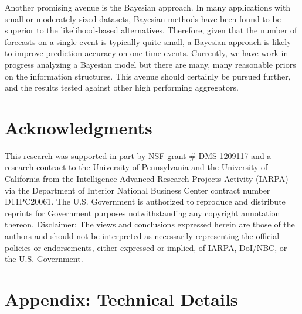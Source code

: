 \documentclass[11pt]{article}
\theoremstyle{definition}
\theoremstyle{definition}
\begin{document}
Another promising avenue is the Bayesian approach. In many applications with small or moderately sized datasets, Bayesian methods have been found to be superior to the likelihood-based alternatives. Therefore, given that the number of forecasts on a single event is typically quite small, a Bayesian approach is likely to improve prediction accuracy on one-time events. Currently, we have
work in progress analyzing a Bayesian model but there are many, many
reasonable priors on the information structures. 
 This avenue should
certainly be pursued further, and the results tested against other high
performing aggregators.


\section*{Acknowledgments} 
This research was supported in part by NSF grant \# DMS-1209117 and a research contract to the University
of Pennsylvania and the University of California from the Intelligence
Advanced Research Projects Activity (IARPA) via the Department of
Interior National Business Center contract number D11PC20061. The
U.S. Government is authorized to reproduce and distribute reprints for
Government purposes notwithstanding any copyright annotation
thereon. Disclaimer: The views and conclusions expressed herein are
those of the authors and should not be interpreted as necessarily
representing the official policies or endorsements, either expressed
or implied, of IARPA, DoI/NBC, or the U.S. Government.


\appendix 
\section*{Appendix: Technical Details}
\label{appendix}

\renewcommand{\thesubsection}{\Alph{subsection}}
\end{document}
